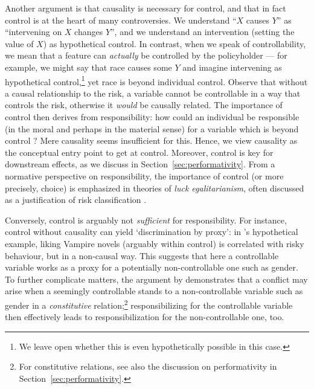 \documentclass[11pt]{article} %
\begin{document}
Another argument is that causality is necessary for control, and that in fact control is at the heart of many controversies. We understand ``$X$ causes $Y$'' as ``intervening on $X$ changes $Y$'', and we understand an intervention (setting the value of $X$) as hypothetical control. In contrast, when we speak of controllability, we mean that a feature can \textit{actually} be controlled by the policyholder --- for example, we might say that race causes some $Y$ and imagine intervening as hypothetical control,\footnote{We leave open whether this is even hypothetically possible in this case.} yet race is beyond individual control. Observe that 
without a causal relationship to the risk, a variable cannot be controllable in a way that controls the risk, otherwise it \textit{would} be causally related. The importance of control then derives from responsibility: how could an individual be responsible (in the moral and perhaps in the material sense) for a variable which is beyond control \citep{abraham1985efficiency}? Mere causality seems insufficient for this. Hence, we view causality as the conceptual entry point to get at control. Moreover, control is key for downstream effects, as we discuss in Section~\ref{sec:performativity}. From a normative perspective on responsibility, the importance of control (or more precisely, choice) is emphasized in theories of \textit{luck egalitarianism}, often discussed as a justification of risk classification \citep{knight2013luck,lippert2015genetic,huseby2016can,bjork2020better}.

Conversely, control is arguably not \textit{sufficient} for responsibility. %
For instance, control without causality can yield `discrimination by proxy': in \citet{swedloff2014risk}'s hypothetical example, liking Vampire novels (arguably within control) is correlated with risky behaviour, but in a non-causal way. This suggests that here a controllable variable works as a proxy for a potentially non-controllable one such as gender. To further complicate matters, the argument by \citet{hu2020s} demonstrates that a conflict may arise when a seemingly controllable stands to a non-controllable variable such as gender in a \textit{constitutive} relation;\footnote{For constitutive relations, see also the discussion on performativity in Section~\ref{sec:performativity}.} responsibilizing for the controllable variable then effectively leads to responsibilization for the non-controllable one, too.
\end{document}
